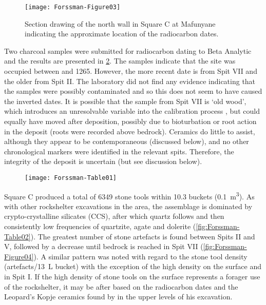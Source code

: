 	\begin{figure}
		\texttt{[image: Forssman-Figure03]}
		\caption{Section drawing of the north wall in Square C at Mafunyane indicating the approximate location of the radiocarbon dates.}
		\centering
		\label{fig:Forssman-Figure03}
	\end{figure}

Two charcoal samples were submitted for radiocarbon dating to Beta Analytic and the results are presented in \cref{fig:Forssman-Table01}. 
The samples indicate that the site was occupied between  and 1265. 
However, the more recent date is from Spit VII and the older from Spit II. 
The laboratory did not find any evidence indicating that the samples were possibly contaminated and so this does not seem to have caused the inverted dates. 
It is possible that the sample from Spit VII is ‘old wood’, which introduces an unresolvable variable into the calibration process \parencite{Kennett_2002}, but could equally have moved after deposition, possibly due to bioturbation \parencite[see][]{Lancaster_2003} or root action in the deposit (roots were recorded above bedrock). 
Ceramics do little to assist, although they appear to be contemporaneous (discussed below), and no other chronological markers were identified in the relevant spits. Therefore, the integrity of the deposit is uncertain (but see discussion below).

	\begin{figure} %
		\texttt{[image: Forssman-Table01]}
		\label{fig:Forssman-Table01}
	\end{figure}


Square C  produced a total of \num{6349} stone tools within \num{10.3} buckets (\SI{0.1}{\meter\cubed}). 
As with other rockshelter excavations in the area, the assemblage is dominated by crypto-crystalline silicates (CCS), 
after which quartz follows and then consistently low frequencies of quartzite, agate and dolerite (\cref{fig:Forssman-Table02}). 
The greatest number of stone artefacts is found between Spits II and V, 
followed by a decrease until bedrock is reached in Spit VII (\cref{fig:Forssman-Figure04}).
A similar pattern was noted with regard to the stone tool density (artefacts/\SI{13}{\liter} bucket) with the exception of the high density on the surface and in Spit I. 
If the high density of stone tools on the surface represents a forager use of the rockshelter, it may be after  based on the radiocarbon dates and the Leopard’s Kopje ceramics found by \textcite{Walker_1994} in the upper levels of his excavation. 


